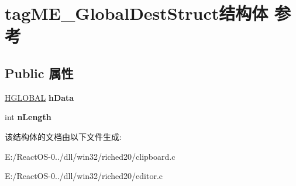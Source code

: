 \hypertarget{structtag_m_e___global_dest_struct}{}\section{tag\+M\+E\+\_\+\+Global\+Dest\+Struct结构体 参考}
\label{structtag_m_e___global_dest_struct}
\subsection*{Public 属性}
\begin{DoxyCompactItemize}
\item 
\mbox{\label{structtag_m_e___global_dest_struct_a2747e98d4168aabbbdf1b1a059797c50}} 
\hyperlink{interfacevoid}{H\+G\+L\+O\+B\+AL} {\bfseries h\+Data}
\item 
\mbox{\label{structtag_m_e___global_dest_struct_a4f87a55e76be3faa5321cc63aaea1c61}} 
int {\bfseries n\+Length}
\end{DoxyCompactItemize}


该结构体的文档由以下文件生成\+:\begin{DoxyCompactItemize}
\item 
E\+:/\+React\+O\+S-\/0../dll/win32/riched20/clipboard.\+c\item 
E\+:/\+React\+O\+S-\/0../dll/win32/riched20/editor.\+c\end{DoxyCompactItemize}
